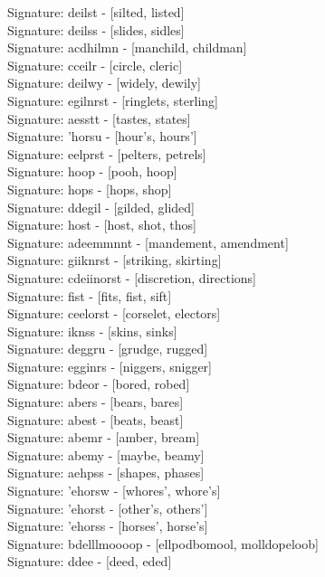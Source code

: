 Signature: {deilst} - [silted, listed] \\
Signature: {deilss} - [slides, sidles] \\
Signature: {acdhilmn} - [manchild, childman] \\
Signature: {cceilr} - [circle, cleric] \\
Signature: {deilwy} - [widely, dewily] \\
Signature: {egilnrst} - [ringlets, sterling] \\
Signature: {aesstt} - [tastes, states] \\
Signature: {'horsu} - [hour's, hours'] \\
Signature: {eelprst} - [pelters, petrels] \\
Signature: {hoop} - [pooh, hoop] \\
Signature: {hops} - [hops, shop] \\
Signature: {ddegil} - [gilded, glided] \\
Signature: {host} - [host, shot, thos] \\
Signature: {adeemmnnt} - [mandement, amendment] \\
Signature: {giiknrst} - [striking, skirting] \\
Signature: {cdeiinorst} - [discretion, directions] \\
Signature: {fist} - [fits, fist, sift] \\
Signature: {ceelorst} - [corselet, electors] \\
Signature: {iknss} - [skins, sinks] \\
Signature: {deggru} - [grudge, rugged] \\
Signature: {egginrs} - [niggers, snigger] \\
Signature: {bdeor} - [bored, robed] \\
Signature: {abers} - [bears, bares] \\
Signature: {abest} - [beats, beast] \\
Signature: {abemr} - [amber, bream] \\
Signature: {abemy} - [maybe, beamy] \\
Signature: {aehpss} - [shapes, phases] \\
Signature: {'ehorsw} - [whores', whore's] \\
Signature: {'ehorst} - [other's, others'] \\
Signature: {'ehorss} - [horses', horse's] \\
Signature: {bdelllmoooop} - [ellpodbomool, molldopeloob] \\
Signature: {ddee} - [deed, eded] \\
